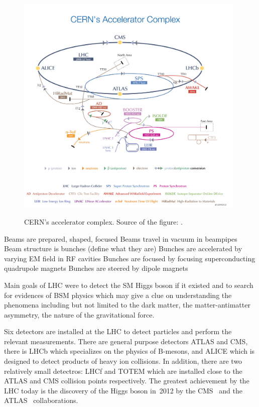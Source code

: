 \begin{figure}[htb]
  \begin{center}
    {\includegraphics[width=0.98\textwidth]{../figs/Exp/CERN_accelerator_complex2013.jpg}}
    \caption{CERN's accelerator complex. Source of the figure: \cite{ref_fig_CERNacceleratorComplex}.}
    \label{fig:CERN_accelerator_complex}
  \end{center}
\end{figure}

Beams are prepared, shaped, focused
Beams travel in vacuum in beampipes
Beam structure is bunches (define what they are)
Bunches are accelerated by varying EM field in RF cavities
Bunches are focused by focusing superconducting quadrupole magnets
Bunches are steered by dipole magnets



Main goals of LHC were to detect the SM Higgs boson if it existed and to search for evidences of BSM physics which may give a clue on understanding the phenomena including but not limited to the dark matter, the matter-antimatter asymmetry, the nature of the gravitational force. 

Six detectors are installed at the LHC to detect particles and perform the relevant measurements. There are general purpose detectors ATLAS and CMS, there is LHCb which specializes on the physics of B-mesons, and ALICE which is designed to detect products of heavy ion collisions. In addition, there are two relatively small detectros: LHCf and TOTEM which are installed close to the ATLAS and CMS collision points respectively. The greatest achievement by the LHC today is the discovery of the Higgs boson in~2012 by the CMS~\cite{ref_HiggsPaperCMS} and the ATLAS~\cite{ref_HiggsPaperATLAS} collaborations. 

